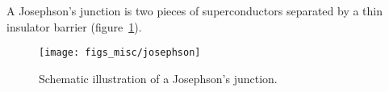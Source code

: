 A Josephson's junction is two pieces of superconductors separated by a thin insulator barrier (figure~\ref{fig:josephson}). %
\begin{figure}[ht]%
	\centering%
    \texttt{[image: figs\_misc/josephson]}%
    \caption[Josephson's junction]{\label{fig:josephson}Schematic illustration of a Josephson's junction.}%
\end{figure}%
%
